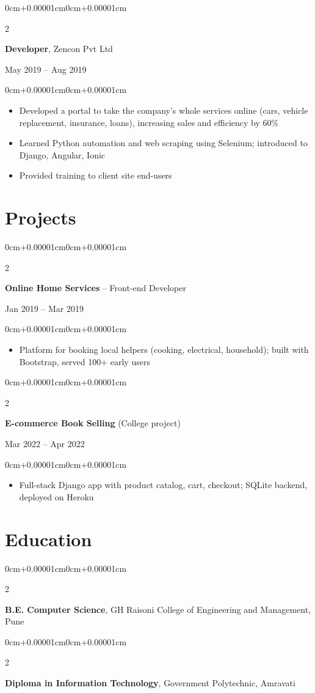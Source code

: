 \documentclass[10pt, letterpaper]{article}
\newenvironment{highlightscompact}{
    \begin{itemize}[topsep=0.04cm, parsep=0.04cm, partopsep=0pt, itemsep=0pt, leftmargin=10pt]
}{
    \end{itemize}
}
\newenvironment{onecolentry}{
    \begin{adjustwidth}{0cm+0.00001cm}{0cm+0.00001cm}
}{
    \end{adjustwidth}
}
\newenvironment{twocolentry}[2][]{
    \onecolentry
    \def\secondColumn{#2}
    \setcolumnwidth{\fill, 4.2cm}
    \begin{paracol}{2}
}{
    \switchcolumn \raggedleft \secondColumn
    \end{paracol}
    \end{adjustwidth}
}
\begin{document}
    \begin{twocolentry}{May 2019 -- Aug 2019}
        \textbf{Developer}, Zencon Pvt Ltd
    \end{twocolentry}
    \vspace{0.1cm}
    \begin{onecolentry}
        \begin{highlightscompact}
            \item Developed a portal to take the company's whole services online (cars, vehicle replacement, insurance, loans), increasing sales and efficiency by 60\%
            \item Learned Python automation and web scraping using Selenium; introduced to Django, Angular, Ionic
            \item Provided training to client site end-users
        \end{highlightscompact}
    \end{onecolentry}

    \section{Projects}
    \begin{twocolentry}{Jan 2019 -- Mar 2019}
        \textbf{Online Home Services} -- Front-end Developer
    \end{twocolentry}
    \begin{onecolentry}
        \begin{highlightscompact}
            \item Platform for booking local helpers (cooking, electrical, household); built with Bootstrap, served 100+ early users
        \end{highlightscompact}
    \end{onecolentry}
    \begin{twocolentry}{Mar 2022 -- Apr 2022}
        \textbf{E-commerce Book Selling} (College project)
    \end{twocolentry}
    \begin{onecolentry}
        \begin{highlightscompact}
            \item Full-stack Django app with product catalog, cart, checkout; SQLite backend, deployed on Heroku
        \end{highlightscompact}
    \end{onecolentry}

    \section{Education}
    \begin{twocolentry}{2023}
        \textbf{B.E. Computer Science}, GH Raisoni College of Engineering and Management, Pune
    \end{twocolentry}
    \begin{twocolentry}{2019}
        \textbf{Diploma in Information Technology}, Government Polytechnic, Amravati
    \end{twocolentry}
\end{document}
